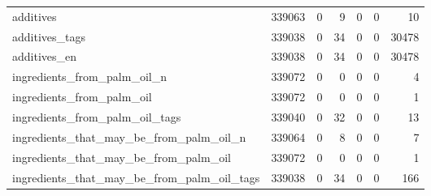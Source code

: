 \begin{tabular}{lrrrrrr}
additives                                  &                                        339063 &                                         0 &                                             9 &                                         0 &                      0 &               10 \\
additives\_tags                             &                                        339038 &                                         0 &                                            34 &                                         0 &                      0 &            30478 \\
additives\_en                               &                                        339038 &                                         0 &                                            34 &                                         0 &                      0 &            30478 \\
ingredients\_from\_palm\_oil\_n                &                                        339072 &                                         0 &                                             0 &                                         0 &                      0 &                4 \\
ingredients\_from\_palm\_oil                  &                                        339072 &                                         0 &                                             0 &                                         0 &                      0 &                1 \\
ingredients\_from\_palm\_oil\_tags             &                                        339040 &                                         0 &                                            32 &                                         0 &                      0 &               13 \\
ingredients\_that\_may\_be\_from\_palm\_oil\_n    &                                        339064 &                                         0 &                                             8 &                                         0 &                      0 &                7 \\
ingredients\_that\_may\_be\_from\_palm\_oil      &                                        339072 &                                         0 &                                             0 &                                         0 &                      0 &                1 \\
ingredients\_that\_may\_be\_from\_palm\_oil\_tags &                                        339038 &                                         0 &                                            34 &                                         0 &                      0 &              166 \\

\end{tabular}
